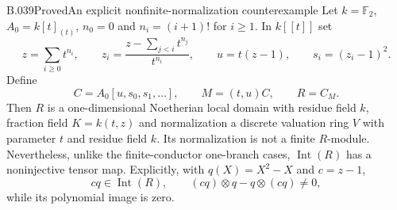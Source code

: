 \begin{saresult}{B.039}{Proved}{An explicit nonfinite-normalization counterexample}
Let $k=\mathbb F_2$, $A_0=k[t]_{(t)}$, $n_0=0$ and
$n_i=(i+1)!$ for $i\ge1$. In $k[[t]]$ set
\[
 z=\sum_{i\ge0}t^{n_i},\qquad
 z_i=\frac{z-\sum_{j<i}t^{n_j}}{t^{n_i}},\qquad
 u=t(z-1),\qquad s_i=(z_i-1)^2.
\]
Define
\[
 C=A_0[u,s_0,s_1,\ldots],\qquad
 M=(t,u)C,\qquad R=C_M.
\]
Then $R$ is a one-dimensional Noetherian local domain with
residue field $k$, fraction field $K=k(t,z)$ and normalization
a discrete valuation ring $V$ with parameter $t$ and residue
field $k$. Its normalization is not a finite $R$-module.
Nevertheless, unlike the finite-conductor one-branch cases,
$\operatorname{Int}(R)$ has a noninjective tensor map.
Explicitly, with $q(X)=X^2-X$ and $c=z-1$,
\[
 cq\in\operatorname{Int}(R),\qquad
 (cq)\otimes q-q\otimes(cq)\ne0,
\]
while its polynomial image is zero.
\end{saresult}
